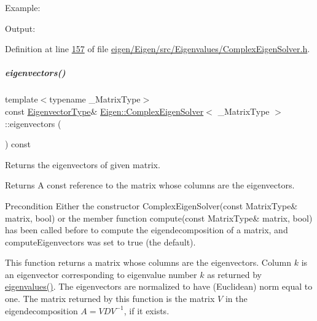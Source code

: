 Example\+: 
\begin{DoxyCodeInclude}
\end{DoxyCodeInclude}
 Output\+: 
\begin{DoxyVerbInclude}
\end{DoxyVerbInclude}
 

Definition at line \hyperlink{eigen_2_eigen_2src_2_eigenvalues_2_complex_eigen_solver_8h_source_l00157}{157} of file \hyperlink{eigen_2_eigen_2src_2_eigenvalues_2_complex_eigen_solver_8h_source}{eigen/\+Eigen/src/\+Eigenvalues/\+Complex\+Eigen\+Solver.\+h}.

\mbox{\label{group___eigenvalues___module_a3aa5e27800349990778da8fa532c1270}} 
\subparagraph{\texorpdfstring{eigenvectors()}{eigenvectors()}\hspace{0.1cm}{\footnotesize\ttfamily [2/2]}}
{\footnotesize\ttfamily template$<$typename \+\_\+\+Matrix\+Type$>$ \\
const \hyperlink{group___eigenvalues___module_a67cd4d20590abfd86b2639c4c8ea3dd6}{Eigenvector\+Type}\& \hyperlink{group___eigenvalues___module_class_eigen_1_1_complex_eigen_solver}{Eigen\+::\+Complex\+Eigen\+Solver}$<$ \+\_\+\+Matrix\+Type $>$\+::eigenvectors (\begin{DoxyParamCaption}{ }\end{DoxyParamCaption}) const\hspace{0.3cm}{\ttfamily [inline]}}



Returns the eigenvectors of given matrix. 

\begin{DoxyReturn}{Returns}
A const reference to the matrix whose columns are the eigenvectors.
\end{DoxyReturn}
\begin{DoxyPrecond}{Precondition}
Either the constructor Complex\+Eigen\+Solver(const Matrix\+Type\& matrix, bool) or the member function compute(const Matrix\+Type\& matrix, bool) has been called before to compute the eigendecomposition of a matrix, and {\ttfamily compute\+Eigenvectors} was set to true (the default).
\end{DoxyPrecond}
This function returns a matrix whose columns are the eigenvectors. Column $ k $ is an eigenvector corresponding to eigenvalue number $ k $ as returned by \hyperlink{group___eigenvalues___module_a10c25c7620e7faedcd39991cce3a757b}{eigenvalues()}. The eigenvectors are normalized to have (Euclidean) norm equal to one. The matrix returned by this function is the matrix $ V $ in the eigendecomposition $ A = V D V^{-1} $, if it exists.

